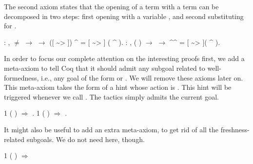 \documentclass[12pt]{report}
\begin{document}
    The second axiom states that the opening of a term  with a 
    term  can be decomposed in two steps: first opening  with
    a variable , and second substituting  for .
\begin{coqdoccode}
\coqdocemptyline
\coqdocnoindent
{}  : \coqdockw{\ensuremath{\forall}}    ,\coqdoceol
\coqdocindent{1.00em}
 \ensuremath{\not=}  \ensuremath{\rightarrow}   \ensuremath{\rightarrow}\coqdoceol
\coqdocindent{1.00em}
([ \~{}> ]) \^{}  = [ \~{}> ] ( \^{} ).\coqdoceol
\coqdocemptyline
\coqdocnoindent
{}  : \coqdockw{\ensuremath{\forall}}   , \coqdoceol
\coqdocindent{1.00em}
  ( ) \ensuremath{\rightarrow}   \ensuremath{\rightarrow}\coqdoceol
\coqdocindent{1.00em}
 \^{}\^{}  = [ \~{}> ]( \^{} ).\coqdoceol
\coqdocemptyline
\end{coqdoccode}
In order to focus our complete attention on the interesting proofs
    first, we add a meta-axiom to tell Coq that it should admit any
    subgoal related to well-formedness, i.e., any goal of the form
      or  . We will remove these axioms later on.
    This meta-axiom takes the form of a hint whose action is .
    This hint will be triggered whenever we call . The 
    tactics simply admits the current goal. \begin{coqdoccode}
\coqdocemptyline
\coqdocnoindent
{} 1 ( \coqdocvar{\_}) \ensuremath{\Rightarrow} .\coqdoceol
\coqdocnoindent
{} 1 ( \coqdocvar{\_}) \ensuremath{\Rightarrow} .\coqdoceol
\coqdocemptyline
\end{coqdoccode}
It might also be useful to add an extra meta-axiom, to get rid of
    all the freshness-related subgoals. We do not need here, though. 


      1 (\coqdocvar{\_}  \coqdocvar{\_}) \ensuremath{\Rightarrow} 
\begin{coqdoccode}
\coqdocemptyline
\end{coqdoccode}
\end{document}
